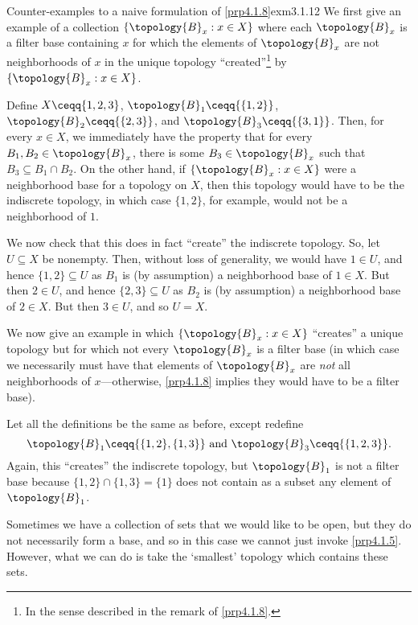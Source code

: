\begin{exm}{Counter-examples to a naive formulation of \cref{prp4.1.8}}{exm3.1.12}
We first give an example of a collection $\{ \topology{B}_x:x\in X\}$ where each $\topology{B}_x$ is a filter base containing $x$ for which the elements of $\topology{B}_x$ are not neighborhoods of $x$ in the unique topology ``created''\footnote{In the sense described in the remark of \cref{prp4.1.8}.} by $\{ \topology{B}_x:x\in X\}$.

Define $X\ceqq \{ 1,2,3\}$, $\topology{B}_1\ceqq \{ \{ 1,2\} \}$, $\topology{B}_2\ceqq \{ \{ 2,3\} \}$, and $\topology{B}_3\ceqq \{ \{ 3,1\} \}$.  Then, for every $x\in X$, we immediately have the property that for every $B_1,B_2\in \topology{B}_x$, there is some $B_3\in \topology{B}_x$ such that $B_3\subseteq B_1\cap B_2$.  On the other hand, if $\{ \topology{B}_x:x\in X \}$ were a neighborhood base for a topology on $X$, then this topology would have to be the indiscrete topology, in which case $\{ 1,2\}$, for example, would not be a neighborhood of $1$.

We now check that this does in fact ``create'' the indiscrete topology.  So, let $U\subseteq X$ be nonempty.  Then, without loss of generality, we would have $1\in U$, and hence $\{ 1,2\} \subseteq U$ as $B_1$ is (by assumption) a neighborhood base of $1\in X$.  But then $2\in U$, and hence $\{ 2,3\} \subseteq U$ as $B_2$ is (by assumption) a neighborhood base of $2\in X$.  But then $3\in U$, and so $U=X$.

\blankline
\noindent
We now give an example in which $\{ \topology{B}_x:x\in X\}$ ``creates'' a unique topology but for which not every $\topology{B}_x$ is a filter base (in which case we necessarily must have that elements of $\topology{B}_x$ are \emph{not} all neighborhoods of $x$---otherwise, \cref{prp4.1.8} implies they would have to be a filter base).

Let all the definitions be the same as before, except redefine
\begin{equation}
\topology{B}_1\ceqq \{ \{ 1,2\} ,\{ 1,3\} \} \text{ and }\topology{B}_3\ceqq \{ \{ 1,2,3\} \} .
\end{equation}
Again, this ``creates'' the indiscrete topology, but $\topology{B}_1$ is not a filter base because $\{ 1,2\} \cap \{ 1,3\} =\{ 1\}$ does not contain as a subset any element of $\topology{B}_1$.
\end{exm}
Sometimes we have a collection of sets that we would like to be open, but they do not necessarily form a base, and so in this case we cannot just invoke \cref{prp4.1.5}.  However, what we can do is take the `smallest' topology which contains these sets.
